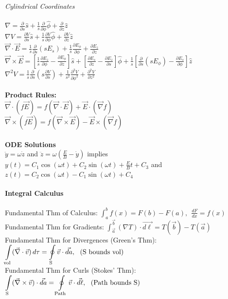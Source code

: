 \documentclass[12pt]{article}
\newcommand{\ds}{\displaystyle}
\begin{document}
\begin{flushleft}
\textit{Cylindrical Coordinates}\\~\\
$\ds \nabla=\frac{\partial}{\partial s}\hat{s}+\frac{1}{s}\frac{\partial}{\partial\phi}\hat{\phi}+\frac{\partial}{\partial z}\hat{z}$\\
$\ds \nabla V=\frac{\partial V}{\partial s}\hat{s}+\frac{1}{s}\frac{\partial V}{\partial\phi}\hat{\phi}+\frac{\partial V}{\partial z}\hat{z}$\\
$\ds \vec{\nabla}\cdot\vec{E}=\frac{1}{s}\frac{\partial}{\partial s}(sE_s)+\frac{1}{s}\frac{\partial E_\phi}{\partial \phi}+\frac{\partial E_z}{\partial z}$\\
$\ds \vec{\nabla}\times\vec{E}=\left[\frac{1}{s}\frac{\partial E_z}{\partial \phi}-\frac{\partial E_\phi}{\partial z}\right]\hat{s}+\left[\frac{\partial E_s}{\partial z}-\frac{\partial E_z}{\partial s}\right]\hat{\phi}+\frac{1}{s}\left[\frac{\partial }{\partial s}(sE_\phi)-\frac{\partial E_s}{\partial \phi}\right]\hat{z}$\\
$\ds \nabla^2V=\frac{1}{s}\frac{\partial}{\partial s}\left(s\frac{\partial V}{\partial s}\right)+\frac{1}{s^2}\frac{\partial^2 V}{\partial \phi^2}+\frac{\partial^2 V}{\partial z^2}$\\~\\

\textbf{Product Rules:}\\
$\ds\vec{\nabla}\cdot(f\vec{E})=f(\vec{\nabla}\cdot\vec{E})+\vec{E}\cdot(\vec{\nabla}f)$\\
$\ds\vec{\nabla}\times(f\vec{E})=f(\vec{\nabla}\times\vec{E})-\vec{E}\times(\vec{\nabla}f)$\\~\\


\textbf{ODE Solutions}\\
$\ddot{y}=\omega\dot{z}$ and $\ddot{z}=\omega(\frac{E}{B}-\dot{y})$ implies $y(t)=C_1\cos(\omega t)+C_2\sin(\omega t)+\frac{E}{B}t+C_3$ and $z(t)=C_2\cos(\omega t)-C_1\sin(\omega t)+C_4$\\~\\


\textbf{Integral Calculus}\\~\\
Fundamental Thm of Calculus: $\ds\int_a^bf(x)=F(b)-F(a),\ \ \frac{dF}{dx}=f(x)$\\
Fundamental Thm for Gradients: $\ds\int_{\vec{a}}^{\vec{b}}(\nabla T)\cdot \vec{d\ell}=T(\vec{b})-T(\vec{a})$\\
Fundamental Thm for Divergences (Green's Thm): $\ds\int\displaylimits_{\text{vol}}(\vec{\nabla}\cdot\vec{v})\,d\tau=\oint\displaylimits_{\text{S}}\vec{v}\cdot\vec{da},\ \ (\text{S bounds vol})$\\
Fundamental Thm for Curls (Stokes' Thm): $\ds\int\displaylimits_{\text{S}}(\vec{\nabla}\times\vec{v})\cdot\vec{da}=\oint\displaylimits_{\text{Path}}\vec{v}\cdot\vec{d\ell},\ \ (\text{Path bounds S})$\\~\\~\\


\end{flushleft}
\end{document}
